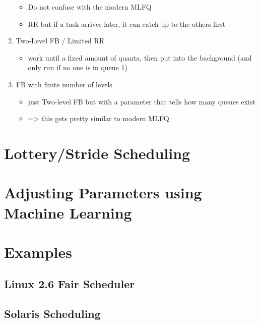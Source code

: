 \documentclass[11pt]{report}
\begin{document}
\begin{enumerate}
\begin{itemize}
\item Do not confuse with the modern MLFQ
\item RR but if a task arrives later, it can catch up to the others first
\end{itemize}
\item Two-Level FB / Limited RR
\label{sec:org2737c32}
\begin{itemize}
\item work until a fixed amount of quanta, then put into the background (and only run if no one is in queue 1)
\end{itemize}
\item FB with finite number of levels
\label{sec:org387ecab}
\begin{itemize}
\item just Two-level FB but with a parameter that tells how many queues exist
\item => this gets pretty similar to modern MLFQ
\end{itemize}
\end{enumerate}
\part{Lottery/Stride Scheduling}
\label{sec:org71e0e31}
\part{Adjusting Parameters using Machine Learning}
\label{sec:orgc617b79}
\part{Examples}
\label{sec:orgb85a0df}
\chapter{Linux 2.6 Fair Scheduler}
\label{sec:org0cc4a49}
\chapter{Solaris Scheduling}
\label{sec:orgfa6e5fa}
\end{document}
